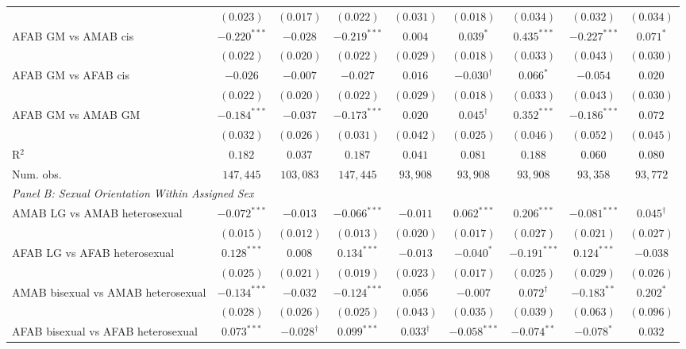 \begin{table}[htpb!]
{\begin{tabular}{l c c c c c c c c}
 & $(0.023)$ & $(0.017)$ & $(0.022)$ & $(0.031)$ & $(0.018)$ & $(0.034)$ & $(0.032)$ & $(0.034)$ \\
AFAB GM vs AMAB cis & $-0.220^{***}$ & $-0.028$ & $-0.219^{***}$ & $0.004$ & $0.039^{*}$ & $0.435^{***}$ & $-0.227^{***}$ & $0.071^{*}$ \\
 & $(0.022)$ & $(0.020)$ & $(0.022)$ & $(0.029)$ & $(0.018)$ & $(0.033)$ & $(0.043)$ & $(0.030)$ \\
AFAB GM vs AFAB cis & $-0.026$ & $-0.007$ & $-0.027$ & $0.016$ & $-0.030^{\dagger}$ & $0.066^{*}$ & $-0.054$ & $0.020$ \\
 & $(0.022)$ & $(0.020)$ & $(0.022)$ & $(0.029)$ & $(0.018)$ & $(0.033)$ & $(0.043)$ & $(0.030)$ \\
AFAB GM vs AMAB GM & $-0.184^{***}$ & $-0.037$ & $-0.173^{***}$ & $0.020$ & $0.045^{\dagger}$ & $0.352^{***}$ & $-0.186^{***}$ & $0.072$ \\
 & $(0.032)$ & $(0.026)$ & $(0.031)$ & $(0.042)$ & $(0.025)$ & $(0.046)$ & $(0.052)$ & $(0.045)$ \\
\hline
R$^2$ & $0.182$ & $0.037$ & $0.187$ & $0.041$ & $0.081$ & $0.188$ & $0.060$ & $0.080$ \\
Num. obs. & $147,445$ & $103,083$ & $147,445$ & $93,908$ & $93,908$ & $93,908$ & $93,358$ & $93,772$ \\
\hline
\multicolumn{9}{l}{\textit{Panel B: Sexual Orientation Within Assigned Sex}} \\
AMAB LG vs AMAB heterosexual & $-0.072^{***}$ & $-0.013$ & $-0.066^{***}$ & $-0.011$ & $0.062^{***}$ & $0.206^{***}$ & $-0.081^{***}$ & $0.045^{\dagger}$ \\
 & $(0.015)$ & $(0.012)$ & $(0.013)$ & $(0.020)$ & $(0.017)$ & $(0.027)$ & $(0.021)$ & $(0.027)$ \\
AFAB LG vs AFAB heterosexual & $0.128^{***}$ & $0.008$ & $0.134^{***}$ & $-0.013$ & $-0.040^{*}$ & $-0.191^{***}$ & $0.124^{***}$ & $-0.038$ \\
 & $(0.025)$ & $(0.021)$ & $(0.019)$ & $(0.023)$ & $(0.017)$ & $(0.025)$ & $(0.029)$ & $(0.026)$ \\
AMAB bisexual vs AMAB heterosexual & $-0.134^{***}$ & $-0.032$ & $-0.124^{***}$ & $0.056$ & $-0.007$ & $0.072^{\dagger}$ & $-0.183^{**}$ & $0.202^{*}$ \\
 & $(0.028)$ & $(0.026)$ & $(0.025)$ & $(0.043)$ & $(0.035)$ & $(0.039)$ & $(0.063)$ & $(0.096)$ \\
AFAB bisexual vs AFAB heterosexual & $0.073^{***}$ & $-0.028^{\dagger}$ & $0.099^{***}$ & $0.033^{\dagger}$ & $-0.058^{***}$ & $-0.074^{**}$ & $-0.078^{*}$ & $0.032$ \\

\end{tabular}}
\end{table}

